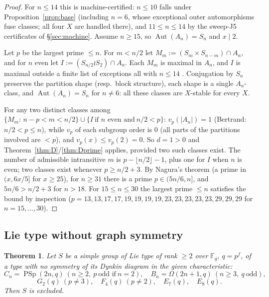 \documentclass[11pt]{amsart}
\newtheorem{theorem}{Theorem}[section]
\theoremstyle{definition}
\theoremstyle{remark}
\DeclareMathOperator{\Aut}{Aut}
\DeclareMathOperator{\PSp}{PSp}
\newcommand{\F}{\mathbb{F}}
\newcommand{\vp}[1]{v_{#1}}
\begin{document}
\begin{proof}
For $n\leq14$ this is machine-certified: $n\leq10$ falls under
Proposition~\ref{prop:base} (including $n=6$, whose exceptional outer
automorphisms fuse classes; all four $X$ are handled there), and
$11\leq n\leq14$ by the sweep-J5 certificates of \S\ref{sec:machine}.
Assume $n\geq15$, so $\Aut(A_n)=S_n$ and $x\mid2$.

Let $p$ be the largest prime $\leq n$. For $m<n/2$ let
$M_m:=(S_m\times S_{n-m})\cap A_n$, and for $n$ even let
$I:=(S_{n/2}\wr S_2)\cap A_n$. Each $M_m$ is maximal in $A_n$, and $I$
is maximal outside a finite list of exceptions all with $n\leq14$
\cite{LPS1987}. Conjugation by $S_n$ preserves the partition shape
(resp.\ block structure), each shape is a single $A_n$-class, and
$\Aut(A_n)=S_n$ for $n\neq6$: all these classes are $X$-stable for every
$X$.

For any two distinct classes among
$\{M_m:\,n-p<m<n/2\}\cup\{I\ \text{if $n$ even and}\ n/2<p\}$:
$\vp{p}(|A_n|)=1$ (Bertrand: $n/2<p\leq n$), while $\vp{p}$ of each
subgroup order is $0$ (all parts of the partitions involved are $<p$),
and $\vp{p}(x)\leq\vp{p}(2)=0$. So $d=1>0$ and
Theorem~\ref{thm:D}/\ref{thm:Dprime} applies, provided two such classes
exist. The number of admissible intransitive $m$ is
$p-\lfloor n/2\rfloor-1$, plus one for $I$ when $n$ is even; two classes
exist whenever $p\geq n/2+3$. By Nagura's theorem \cite{Nagura} (a prime
in $(x,6x/5]$ for $x\geq25$), for $n\geq31$ there is a prime
$p\in(5n/6,n]$, and $5n/6>n/2+3$ for $n>18$. For $15\leq n\leq30$ the
largest prime $\leq n$ satisfies the bound by inspection
($p=13,13,17,17,19,19,19,19,23,23,23,23,23,29,29,29$ for
$n=15,\dots,30$).
\end{proof}

\subsection{Lie type without graph symmetry}

\begin{theorem}\label{thm:nograph}
Let $S$ be a simple group of Lie type of rank $\geq2$ over $\F_q$,
$q=p^f$, of a type with no symmetry of its Dynkin diagram in the given
characteristic:
\[
C_n=\PSp(2n,q)\ (n\geq2,\ p\ \text{odd if}\ n=2),\quad
B_n=\Omega(2n{+}1,q)\ (n\geq3,\ q\ \text{odd}),
\]
\[
G_2(q)\ (p\neq3),\quad F_4(q)\ (p\neq2),\quad E_7(q),\quad E_8(q).
\]
Then $S$ is excluded.
\end{theorem}
\end{document}
